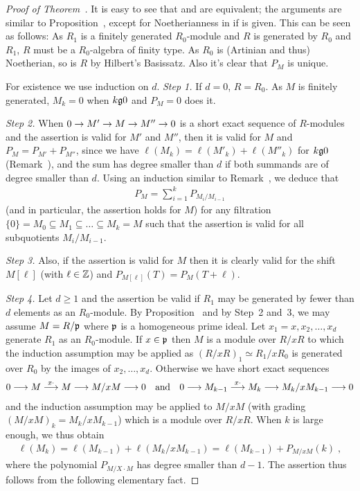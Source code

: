 \documentclass[a4paper,parskip=half,numbers=enddot, DIV=12]{scrreprt}
\begin{document}
\begin{proof}[Proof of Theorem~]
    It is easy to see that  and  are equivalent; the arguments are similar to Proposition~, except for Noetherianness in  if  is given. This can be seen as follows: As $R_1$ is a finitely generated $R_0$-module and $R$ is generated by $R_0$ and $R_1$, $R$ must be a $R_0$-algebra of finity type. As $R_0$ is (Artinian and thus) Noetherian, so is $R$ by Hilbert's Basissatz. Also it's clear that $P_M$ is unique.
    
    For existence we use induction on $d$. \emph{Step 1.} If $d=0$, $R=R_0$. As $M$ is finitely generated, $M_k = 0$ when $k\gge0$ and $P_M =0$ does it. 
    
    \emph{Step 2.} When $0\morphism M'\morphism M\morphism M'' \morphism 0$ is a short exact sequence of $R$-modules and the assertion is valid for $M'$ and $M''$, then it is valid for $M$ and $P_M = P_{M'} +P_{M''}$, since we have $\ell(M_k) = \ell(M'_k)+\ell(M''_k) $ for $k\gge 0$ (Remark~), and the sum has degree smaller than $d$ if both summands are of degree smaller than $d$. Using an induction similar to Remark~, we deduce that 
    \begin{align*}
    	P_M=\sum_{i=1}^kP_{M_i/M_{i-1}}
    \end{align*}
    (and in particular, the assertion holds for $M$) for any filtration $\{0\}=M_0\subseteq M_1\subseteq\ldots\subseteq M_k=M$ such that the assertion is valid for all subquotients $M_i/M_{i-1}$. 
    
    \emph{Step 3.} Also, if the assertion is valid for $M$ then it is clearly valid for the shift $M[\ell]$ (with $\ell\in\mathbb{Z}$) and $P_{M[\ell]}(T) = P_M(T+\ell)$. 
    
    \emph{Step 4.} Let $d\geq 1$ and the assertion be valid if $R_1$ may be generated by fewer than $d$ elements as an $R_0$-module. By Proposition~ and by Step~2 and~3, we may assume $M=R/\mathfrak{p}$ where $\mathfrak{p}$ is a homogeneous prime ideal. Let $x_1=x,x_2,\ldots, x_d$ generate $R_1$ as an $R_0$-module. If $x\in\mathfrak{p}$ then $M$ is a module over $R/x R$ to which the induction assumption may be applied as $(R/xR)_1\simeq R_1/xR_0$ is generated over $R_0$ by the images of $x_2,\ldots, x_d$. Otherwise we have short exact sequences 
    \begin{align*}
        0 \morphism M \morphism[x\cdot] M \morphism M/xM \morphism 0\quad\text{and}\quad
        0 \morphism M_{k-1}\morphism[x\cdot] M_k \morphism M_k/x M_{k-1} \morphism 0
    \end{align*}
    and the induction assumption may be applied to $M/xM$ (with grading $(M/xM)_k = M_k/xM_{k-1}$) which is a module over $R/xR$. When $k$ is large enough, we thus obtain
    \begin{align*}
    	\ell(M_k)=\ell(M_{k-1})+\ell(M_k/xM_{k-1})=\ell(M_{k-1})+P_{M/xM}(k)\;,
    \end{align*}
    where the polynomial $P_{M/X\cdot M}$ has degree smaller than $d-1$. The assertion thus follows from the following elementary fact.
\end{proof}
\end{document}
